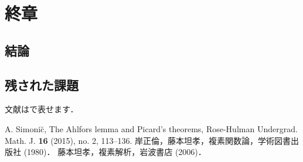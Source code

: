 \documentclass [dvipdfmx] {jsarticle}
\numberwithin{equation}{section}
\theoremstyle{definition} %
\theoremstyle{definition} %
\begin{document}
\section{終章}
\subsection{結論}
\subsection{残された課題}
文献は\cite{Si}で表せます．
\begin{thebibliography}{9}
 A. Simoni\u{c}, The Ahlfors lemma and Picard's theorems, 
Rose-Hulman Undergrad. Math. J. {\bf 16} (2015), no. 2, 113--136. 
 岸正倫，藤本坦孝，複素関数論，学術図書出版社 (1980)．
 藤本坦孝，複素解析，岩波書店 (2006)．


\end{thebibliography}
\end{document}
